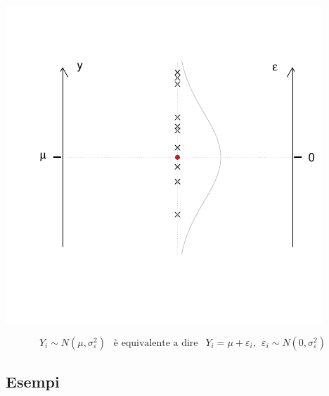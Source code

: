 \documentclass[
  11pt,
]{book}
\theoremstyle{mytheoremstyle}
\theoremstyle{mydefstyle}
\begin{document}
\begin{center}\includegraphics{Appunti_di_Statistica_2025_files/figure-latex/17-regressione-I-6-1} \end{center}

\[Y_i\sim N(\mu,\sigma_\varepsilon^2)~~\text{ è equivalente a dire }~~Y_i=\mu+\varepsilon_i,~~\varepsilon_i\sim N(0,\sigma_\varepsilon^2)\]

\subsection{Esempi}\label{esempi-2}
\end{document}
